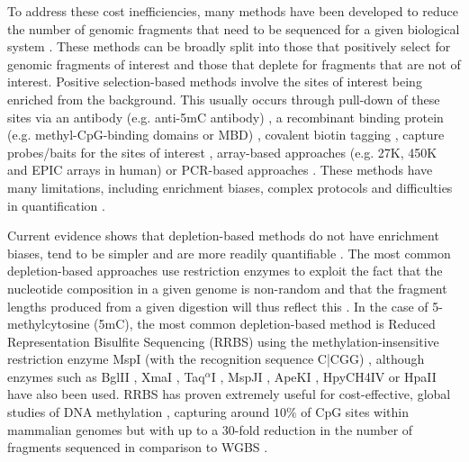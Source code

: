 To address these cost inefficiencies, many methods have been developed to reduce the number of genomic fragments that need to be sequenced for a given biological system \cite{Suzuki2013,Plongthongkum2014,Yong2016,Kurdyukov2016,Kacmarczyk2018}. These methods can be broadly split into those that positively select for genomic fragments of interest and those that deplete for fragments that are not of interest. Positive selection-based methods involve the sites of interest being enriched from the background. This usually occurs through pull-down of these sites via an antibody (e.g. anti-\acrshort{5mC} antibody) \cite{Taiwo2012}, a recombinant binding protein (e.g. methyl-\acrshort{CpG}-binding domains or \acrshort{MBD}) \cite{Brinkman2010}, covalent biotin tagging \cite{Kriukiene2013}, capture probes/baits for the sites of interest \cite{Ivanov2013,Allum2015,Cheung2017}, array-based approaches (e.g. \acrshort{27K}, \acrshort{450K} and \acrshort{EPIC} arrays in human) \cite{Bibikova2009,Bibikova2011,Pidsley2016,Hodges2009} or \acrshort{PCR}-based approaches \cite{Deng2009,Diep2012,Komori2011,Paul2014,Bernstein2015,Yang2015}. These methods have many limitations, including enrichment biases, complex protocols and difficulties in quantification \cite{Suzuki2013,Yong2016}.

\bigskip 

Current evidence shows that depletion-based methods do not have enrichment biases, tend to be simpler and are more readily quantifiable \cite{Suzuki2013,Kurdyukov2016}. The most common depletion-based approaches use restriction enzymes to exploit the fact that the nucleotide composition in a given genome is non-random and that the fragment lengths produced from a given digestion will thus reflect this \cite{Cedar1979,Cohen-Karni2011,Bystrykh2013,Martinez-Arguelles2014,Yu2004}. In the case of 5-methylcytosine (5mC), the most common depletion-based method is Reduced Representation Bisulfite Sequencing (\acrshort{RRBS}) using the methylation-insensitive restriction enzyme MspI (with the recognition sequence C|CGG) \cite{Meissner2008,Boyle2012}, although enzymes such as BglII \cite{Meissner2005}, XmaI \cite{Tanas2017}, Taq$^\alpha$I \cite{Lee2014,Lim2016}, MspJI \cite{Huang2013} , ApeKI \cite{Wang2013}, HpyCH4IV or HpaII \cite{Kirschner2016} have also been used. RRBS has proven extremely useful for cost-effective, global studies of DNA methylation \cite{Meissner2008,Lee2014,Gu2010,Stubbs2017}, capturing around $10\%$ of CpG sites within mammalian genomes but with up to a 30-fold reduction in the number of fragments sequenced in comparison to WGBS \cite{Smith2009}. 


